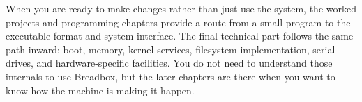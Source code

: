 When you are ready to make changes rather than just use the system, the worked projects and programming chapters provide a route from a small program to the executable format and system interface. The final technical part follows the same path inward: boot, memory, kernel services, filesystem implementation, serial drives, and hardware-specific facilities. You do not need to understand those internals to use Breadbox, but the later chapters are there when you want to know how the machine is making it happen.
